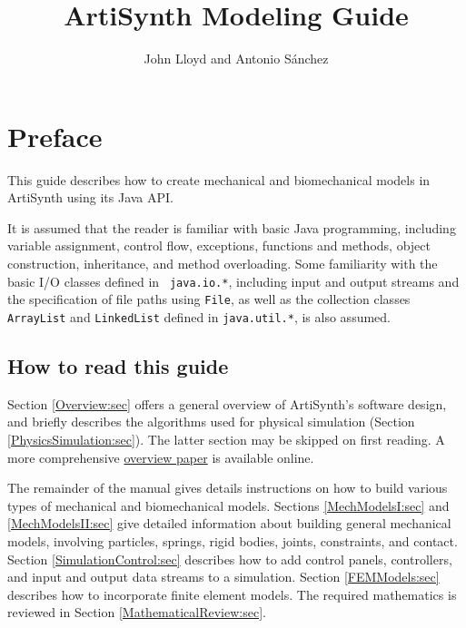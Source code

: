 \documentclass{book}
\title{ArtiSynth Modeling Guide}
\author{John Lloyd and Antonio S\'anchez}
\date{}
\begin{document}
\frontmatter

\maketitle

\iflatexml{\large\pubdate}\fi

\tableofcontents


\chapter*{Preface}

This guide describes how to create mechanical and biomechanical models
in ArtiSynth using its Java API. 

It is assumed that the reader is familiar with basic Java programming,
including variable assignment, control flow, exceptions, functions and
methods, object construction, inheritance, and method overloading.
Some familiarity with the basic I/O classes defined in {\tt
java.io.*}, including input and output streams and the specification
of file paths using {\tt File}, as well as the collection classes
{\tt ArrayList} and {\tt LinkedList} defined in {\tt java.util.*}, is
also assumed.

\section*{How to read this guide}

Section \ref{Overview:sec} offers a general overview of ArtiSynth's
software design, and briefly describes the algorithms used for
physical simulation (Section \ref{PhysicsSimulation:sec}). The latter
section may be skipped on first reading. A more comprehensive
\href{http://www.artisynth.org/doc/artisynth.pdf}{overview paper} is
available online.

The remainder of the manual gives details instructions on how to build
various types of mechanical and biomechanical models.  Sections
\ref{MechModelsI:sec} and \ref{MechModelsII:sec} give detailed
information about building general mechanical models, involving
particles, springs, rigid bodies, joints, constraints, and
contact. Section \ref{SimulationControl:sec} describes how to add
control panels, controllers, and input and output data streams to a
simulation.  Section \ref{FEMModels:sec} describes how to incorporate
finite element models. The required mathematics is reviewed in Section
\ref{MathematicalReview:sec}.
\end{document}
